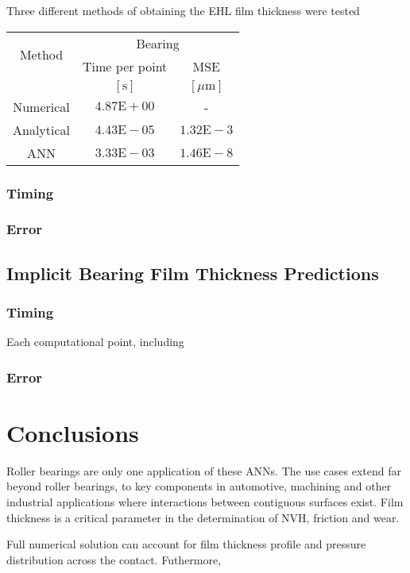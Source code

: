 Three different methods of obtaining the EHL film thickness were tested

\begin{tabular}{|c|c|c|}
	\hline \multirow{2}{*}{ Method } & \multicolumn{2}{|c|}{ Bearing } \\
	\cline { 2 - 3 } & Time per point & MSE \\
	\cline { 2 - 3 } & {$[\mathrm{s}]$} & {$[\mu \mathrm{m}]$} \\
	\hline Numerical & $4.87 \mathrm{E}+00$ & - \\
	\hline Analytical & $4.43 \mathrm{E}-05$ & $1.32 \mathrm{E}-3$ \\
	\hline ANN & $3.33 \mathrm{E}-03$ & $1.46 \mathrm{E}-8$ \\
	\hline
\end{tabular}

\subsubsection{Timing}
\subsubsection{Error}

\subsection{Implicit Bearing Film Thickness Predictions}

\subsubsection{Timing}
Each computational point, including 

\subsubsection{Error}


\section{Conclusions}
Roller bearings are only one application of these ANNs. The use cases extend far beyond roller bearings, to key components in automotive, machining and other industrial applications where interactions between contiguous surfaces exist. Film thickness is a critical parameter in the determination of NVH, friction and wear.

Full numerical solution can account for film thickness profile and pressure distribution across the contact. Futhermore, 

